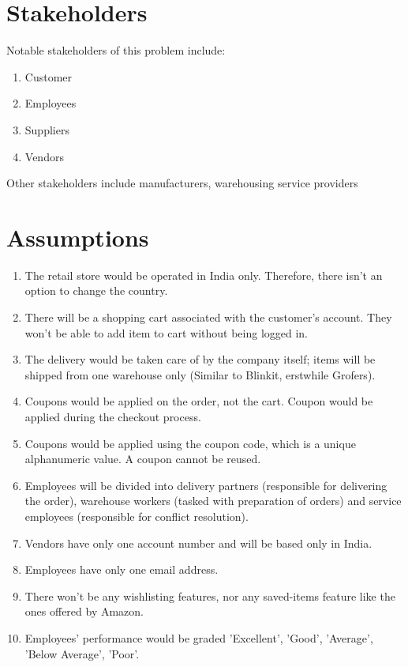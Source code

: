\documentclass[12pt]{report}
\begin{document}
    \section{Stakeholders}
    Notable stakeholders of this problem include:
    \begin{enumerate}
        \item Customer
        \item Employees
        \item Suppliers
        \item Vendors
    \end{enumerate}
    Other stakeholders include manufacturers, warehousing service providers
    
    \section{Assumptions}
    \begin{enumerate}
        \item The retail store would be operated in India only. Therefore, there isn't an option to change the country.
        \item There will be a shopping cart associated with the customer's account. They won't be able to add item to cart without being logged in.
        \item The delivery would be taken care of by the company itself; items will be shipped from one warehouse only (Similar to Blinkit, erstwhile Grofers).
        \item Coupons would be applied on the order, not the cart. Coupon would be applied during the checkout process.
        \item Coupons would be applied using the coupon code, which is a unique alphanumeric value. A coupon cannot be reused.
        \item Employees will be divided into delivery partners (responsible for delivering the order), warehouse workers (tasked with preparation of orders) and service employees (responsible for conflict resolution).
        \item Vendors have only one account number and will be based only in India.
        \item Employees have only one email address.
        \item There won't be any wishlisting features, nor any saved-items feature like the ones offered by Amazon.
        \item Employees' performance would be graded 'Excellent', 'Good', 'Average', 'Below Average', 'Poor'.
    \end{enumerate}
\end{document}
